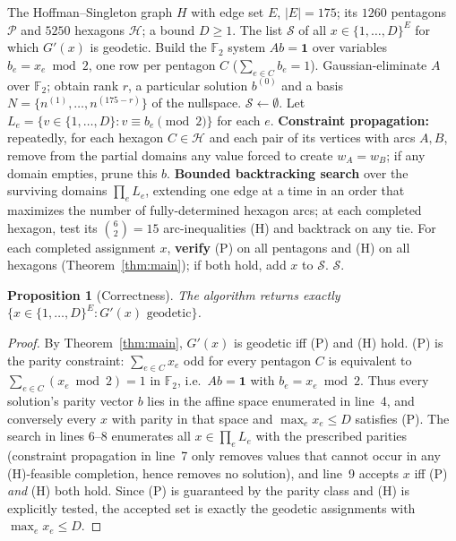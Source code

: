 \documentclass{amsart}
\newtheorem{proposition}{Proposition}
\theoremstyle{definition}
\begin{document}
\begin{algorithm}[H]
\caption{Enumerate geodetic homeomorphs of $H$ with $\max_e x_e\le D$}
\begin{algorithmic}[1]
\Require The Hoffman--Singleton graph $H$ with edge set $E$, $|E|=175$; its
$1260$ pentagons $\mathcal P$ and $5250$ hexagons $\mathcal H$; a bound $D\ge1$.
\Ensure The list $\mathcal S$ of all $x\in\{1,\dots,D\}^{E}$ for which $G'(x)$ is
geodetic.
\State Build the $\mathbb F_2$ system $A b = \mathbf 1$ over variables
$b_e=x_e\bmod 2$, one row per pentagon $C$ ($\sum_{e\in C}b_e=1$).
\State Gaussian-eliminate $A$ over $\mathbb F_2$; obtain rank $r$, a particular
solution $b^{(0)}$ and a basis $N=\{n^{(1)},\dots,n^{(175-r)}\}$ of the
nullspace. 
\State $\mathcal S\gets\emptyset$.
   \State Let $L_e=\{v\in\{1,\dots,D\}: v\equiv b_e \pmod 2\}$ for each $e$.
   \State \textbf{Constraint propagation:} repeatedly, for each hexagon
   $C\in\mathcal H$ and each pair of its vertices with arcs $A,B$, remove from
   the partial domains any value forced to create $w_A=w_B$; if any domain
   empties, prune this $b$.
   \State \textbf{Bounded backtracking search} over the surviving domains
   $\prod_e L_e$, extending one edge at a time in an order that maximizes the
   number of fully-determined hexagon arcs; at each completed hexagon, test its
   $\binom{6}{2}=15$ arc-inequalities (H) and backtrack on any tie.
   \State For each completed assignment $x$, \textbf{verify} (P) on all
   pentagons and (H) on all hexagons (Theorem~\ref{thm:main}); if both hold, add
   $x$ to $\mathcal S$.
\EndFor
\State \Return $\mathcal S$.
\end{algorithmic}
\end{algorithm}

\begin{proposition}[Correctness]
The algorithm returns exactly $\{x\in\{1,\dots,D\}^{E}: G'(x)\text{ geodetic}\}$.
\end{proposition}

\begin{proof}
By Theorem~\ref{thm:main}, $G'(x)$ is geodetic iff (P) and (H) hold. (P) is the
parity constraint: $\sum_{e\in C}x_e$ odd for every pentagon $C$ is equivalent to
$\sum_{e\in C}(x_e\bmod 2)=1$ in $\mathbb F_2$, i.e.\ $Ab=\mathbf 1$ with
$b_e=x_e\bmod2$. Thus every solution's parity vector $b$ lies in the affine space
enumerated in line~4, and conversely every $x$ with parity in that space and
$\max_e x_e\le D$ satisfies (P). The search in lines 6--8 enumerates all
$x\in\prod_e L_e$ with the prescribed parities (constraint propagation in line~7
only removes values that cannot occur in any (H)-feasible completion, hence
removes no solution), and line~9 accepts $x$ iff (P) \emph{and} (H) both hold.
Since (P) is guaranteed by the parity class and (H) is explicitly tested,
the accepted set is exactly the geodetic assignments with $\max_e x_e\le D$.
\end{proof}
\end{document}
